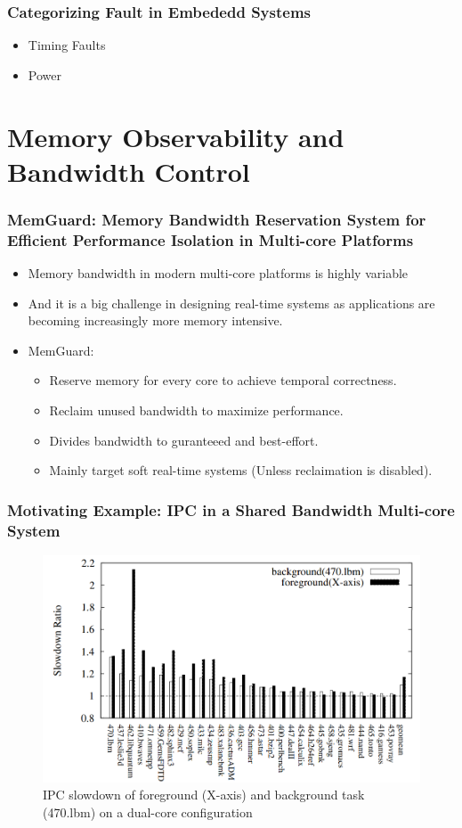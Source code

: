 \documentclass{beamer}
\begin{document}
\begin{frame}
    \frametitle{Categorizing Fault in Embededd Systems}
    \begin{itemize}
        \item Timing Faults
        \item Power
    \end{itemize}
\end{frame}
\section{Memory Observability and Bandwidth Control}
\begin{frame}
    \frametitle{MemGuard: Memory Bandwidth Reservation System for Efficient
    Performance Isolation in Multi-core Platforms}
    \begin{itemize}
        \item Memory bandwidth in modern multi-core platforms is highly
            variable
        \item And it is a big challenge in designing real-time systems as
            applications are becoming increasingly more memory intensive.
        \item MemGuard:
            \begin{itemize}
                \item Reserve memory for every core to achieve temporal
                    correctness.
                \item Reclaim unused bandwidth to maximize performance.
                \item Divides bandwidth to guranteeed and best-effort.
                \item Mainly target soft real-time systems
                    (Unless reclaimation is disabled).
            \end{itemize}
    \end{itemize}
\end{frame}

\begin{frame}
    \frametitle{Motivating Example: IPC in a Shared Bandwidth Multi-core System}
    \begin{figure}
        \centering
        \includegraphics[width=0.80\columnwidth]{memguard.png}
        \caption{IPC slowdown of foreground (X-axis) and background
        task (470.lbm) on a dual-core configuration}
        \label{fig:TraceEnable}
    \end{figure}
\end{frame}
\end{document}
